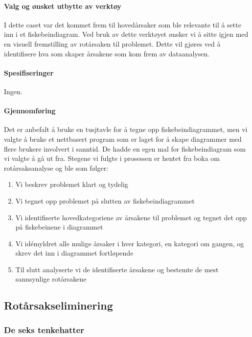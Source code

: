 \paragraph{Valg og ønsket utbytte av verktøy}
I dette caset var det kommet frem til hovedårsaker som ble relevante til å sette inn i et fiskebeindiagram. Ved bruk av dette verktøyet ønsker vi å sitte igjen med en visuell fremstilling av rotårsaken til problemet. Dette vil gjøres ved å identifisere hva som skaper årsakene som kom frem av dataanalysen. 

\paragraph{Spesifiseringer}
Ingen.

\paragraph{Gjennomføring}
Det er anbefalt å bruke en tusjtavle for å tegne opp fiskebeindiagrammet, men vi valgte å bruke et nettbasert program som er laget for å skape diagrammer med flere brukere involvert i sanntid. De hadde en egen mal for fiskebeindiagram som vi valgte å gå ut fra. Stegene vi fulgte i prosessen er hentet fra boka om rotårsaksanalyse \cite{RCA} og ble som følger:

\begin{enumerate}
    \item Vi beskrev problemet klart og tydelig
    \item Vi tegnet opp problemet på slutten av fiskebeindiagrammet
    \item Vi identifiserte hovedkategoriene av årsakene til problemet og tegnet det opp på fiskebeinene i diagrammet
    \item Vi idémyldret alle mulige årsaker i hver kategori, en kategori om gangen, og skrev det inn i diagrammet fortløpende
    \item Til slutt analyserte vi de identifiserte årsakene og bestemte de mest sannsynlige rotårsakene
\end{enumerate}


\subsection{Rotårsakseliminering}

\subsubsection{De seks tenkehatter}

